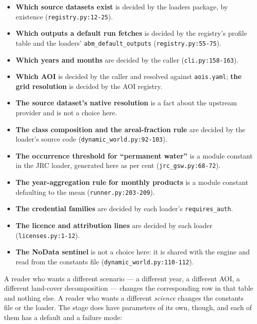 \documentclass[11pt,a4paper]{article}
\newcommand{\code}[1]{\texttt{#1}}
\begin{document}
\begin{itemize}
\item \textbf{Which source datasets exist} is decided by the loaders package,
by existence (\code{registry.py:12-25}).
\item \textbf{Which outputs a default run fetches} is decided by the
registry's profile table and the loaders' \code{abm\_default\_outputs}
(\code{registry.py:55-75}).
\item \textbf{Which years and months} are decided by the caller
(\code{cli.py:158-163}).
\item \textbf{Which AOI} is decided by the caller and resolved against
\code{aois.yaml}; \textbf{the grid resolution} is decided by the AOI
registry.
\item \textbf{The source dataset's native resolution} is a fact about the
upstream provider and is not a choice here.
\item \textbf{The class composition and the areal-fraction rule} are decided
by the loader's source code (\code{dynamic\_world.py:92-103}).
\item \textbf{The occurrence threshold for ``permanent water''} is a module
constant in the JRC loader, generated here as
 per cent
(\code{jrc\_gsw.py:68-72}).
\item \textbf{The year-aggregation rule for monthly products} is a module
constant defaulting to the mean (\code{runner.py:203-209}).
\item \textbf{The credential families} are decided by each loader's
\code{requires\_auth}.
\item \textbf{The licence and attribution lines} are decided by each loader
(\code{licenses.py:1-12}).
\item \textbf{The NoData sentinel} is not a choice here: it is shared with the
engine and read from the constants file
(\code{dynamic\_world.py:110-112}).
\end{itemize}

A reader who wants a different scenario --- a different year, a different
AOI, a different land-cover decomposition --- changes the corresponding row
in that table and nothing else. A reader who wants a different \emph{science}
changes the constants file or the loader. The stage does have parameters of
its own, though, and each of them has a default and a failure mode:
\end{document}

